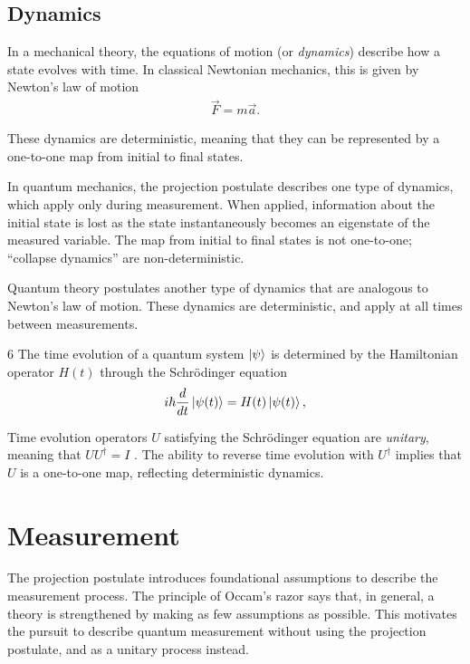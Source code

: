 \section{Dynamics}
In a mechanical theory, the equations of motion (or \textit{dynamics}) describe how a state evolves with time. In classical Newtonian mechanics, this is given by Newton's law of motion
\begin{align}
  \vec{F} = m\vec{a}.
\end{align}

These dynamics are deterministic, meaning that they can be represented by a one-to-one map from initial to final states.

In quantum mechanics, the projection postulate describes one type of dynamics, which apply only during measurement. When applied, information about the initial state is lost as the state instantaneously becomes an eigenstate of the measured variable. The map from initial to final states is not one-to-one; ``collapse dynamics'' are non-deterministic.

Quantum theory postulates another type of dynamics that are analogous to Newton's law of motion. These dynamics are deterministic, and apply at all times between measurements.
\begin{Thm:Postulate}{6}
  The time evolution of a quantum system $\ket{\psi}$ is determined by the Hamiltonian operator $H(t)$ through the Schrödinger equation
  \begin{align}
    i\hbar \frac{d}{dt} \ket{\psi(t)} = H(t)\ket{\psi(t)},
  \end{align}
\end{Thm:Postulate}
Time evolution operators $U$ satisfying the Schrödinger equation are \textit{unitary}, meaning that $UU^\dagger = I$ \cite{Griffiths}. The ability to reverse time evolution with $U^\dagger$ implies that $U$ is a one-to-one map, reflecting deterministic dynamics.

\chapter{Measurement} \label{Chapter 4}

The projection postulate introduces foundational assumptions to describe the measurement process. The principle of Occam's razor says that, in general, a theory is strengthened by making as few assumptions as possible. This motivates the pursuit to describe quantum measurement without using the projection postulate, and as a unitary process instead.

